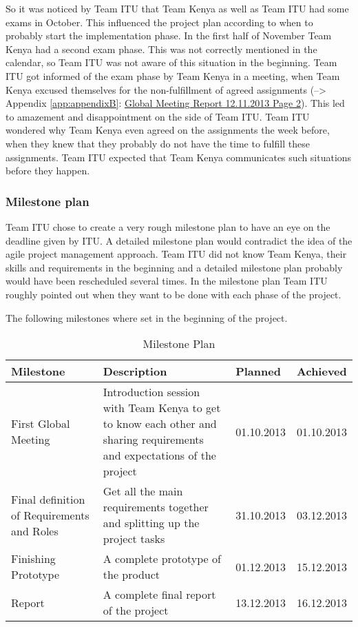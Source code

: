 So it was noticed by Team ITU that Team Kenya as well as Team ITU had some exams in October. This influenced the project plan according to when to probably start the implementation phase. In the first half of November Team Kenya had a second exam phase. This was not correctly mentioned in the calendar, so Team ITU was not aware of this situation in the beginning. Team ITU got informed of the exam phase by Team Kenya in a meeting, when Team Kenya excused themselves for the non-fulfillment of agreed assignments (--> Appendix \ref{app:appendixB}: \hyperlink{GSD20131112.2}{Global Meeting Report 12.11.2013 Page 2}). This led to amazement and disappointment on the side of Team ITU. Team ITU wondered why Team Kenya even agreed on the assignments the week before, when they knew that they probably do not have the time to fulfill these assignments. Team ITU expected that Team Kenya communicates such situations before they happen.

\subsubsection{Milestone plan}
Team ITU chose to create a very rough milestone plan to have an eye on the deadline given by ITU. A detailed milestone plan would contradict the idea of the agile project management approach. Team ITU did not know Team Kenya, their skills and requirements in the beginning and a detailed milestone plan probably would have been rescheduled several times. In the milestone plan Team ITU roughly pointed out when they want to be done with each phase of the project.

The following milestones where set in the beginning of the project.

\begin{table}[htb]
	\centering
	\begin{tabular}{ |  p{4cm} |  p{6cm} | l | l |}
    		\hline
   		Milestone & Description & Planned & Achieved \\ \hline
    		First Global Meeting & Introduction session with Team Kenya to get to know each other and sharing requirements and expectations of the project & 01.10.2013 & 01.10.2013 \\ \hline
    		Final definition of Requirements and Roles & Get all the main requirements together and splitting up the project tasks & 31.10.2013 & 03.12.2013 \\ \hline
    		Finishing Prototype & A complete prototype of the product & 01.12.2013 & 15.12.2013\\ \hline
		Report & A complete final report of the project & 13.12.2013 & 16.12.2013\\ \hline
	\end{tabular}
	\caption{Milestone Plan}
	\label{tab:milestones_table}
\end{table}

